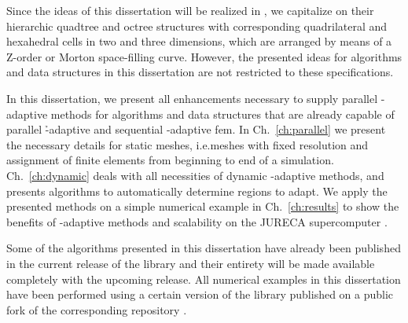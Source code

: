 Since the ideas of this dissertation will be realized in \dealii{}, we capitalize on their hierarchic quadtree and octree structures with corresponding quadrilateral and hexahedral cells in two and three dimensions, which are arranged by means of a Z-order or Morton space-filling curve.
However, the presented ideas for algorithms and data structures in this dissertation are not restricted to these specifications.



In this dissertation, we present all enhancements necessary to supply parallel \hp-adaptive methods for algorithms and data structures that are already capable of parallel \h-adaptive and sequential \hp-adaptive \gls{fem}. In Ch.~\ref{ch:parallel} we present the necessary details for static meshes, i.e.\@ meshes with fixed resolution and assignment of finite elements from beginning to end of a simulation. Ch.~\ref{ch:dynamic} deals with all necessities of dynamic \hp-adaptive methods, and presents algorithms to automatically determine regions to adapt. We apply the presented methods on a simple numerical example in Ch.~\ref{ch:results} to show the benefits of \hp-adaptive methods and scalability on the JURECA supercomputer \parencite{krause2016,jureca}.

Some of the algorithms presented in this dissertation have already been published in the current release of the \dealii{} library \parencite{arndt2019} and their entirety will be made available completely with the upcoming release. All numerical examples in this dissertation have been performed using a certain version of the library published on a public fork \textcite{finaldissertation} of the corresponding \dealii{} repository \textcite{dealii920pre}.

